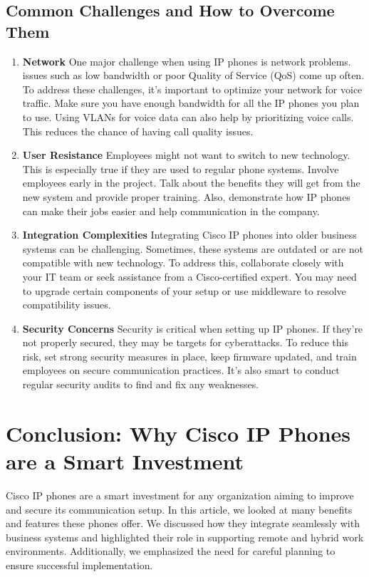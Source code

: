 \documentclass[11pt,a4paper]{article}
\begin{document}
\subsection*{Common Challenges and How to Overcome Them}
\begin{enumerate}
    \item \textbf{Network}
    One major challenge when using IP phones is network problems. issues such as low bandwidth or poor Quality of Service (QoS) come up often. To address these challenges, it’s important to optimize your network for voice traffic. Make sure you have enough bandwidth for all the IP phones you plan to use. Using VLANs for voice data can also help by prioritizing voice calls. This reduces the chance of having call quality issues.

    \item \textbf{User Resistance}
    Employees might not want to switch to new technology. This is especially true if they are used to regular phone systems. Involve employees early in the project. Talk about the benefits they will get from the new system and provide proper training. Also, demonstrate how IP phones can make their jobs easier and help communication in the company.
    
    \item \textbf{Integration Complexities}
    Integrating Cisco IP phones into older business systems can be challenging. Sometimes, these systems are outdated or are not compatible with new technology. To address this, collaborate closely with your IT team or seek assistance from a Cisco-certified expert. You may need to upgrade certain components of your setup or use middleware to resolve compatibility issues.
    \item \textbf{Security Concerns}
    Security is critical when setting up IP phones. If they're not properly secured, they may be targets for cyberattacks. To reduce this risk, set strong security measures in place, keep firmware updated, and train employees on secure communication practices. It’s also smart to conduct regular security audits to find and fix any weaknesses.
\end{enumerate}

\section*{Conclusion: Why Cisco IP Phones are a Smart Investment}

Cisco IP phones are a smart investment for any organization aiming to improve and secure its communication setup. In this article, we looked at many benefits and features these phones offer. We discussed how they integrate seamlessly with business systems and highlighted their role in supporting remote and hybrid work environments. Additionally, we emphasized the need for careful planning to ensure successful implementation.
\end{document}
